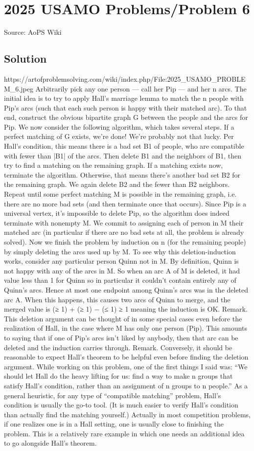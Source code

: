 \documentclass[12pt]{article}
\begin{document}
\section*{{2025 USAMO Problems/Problem 6}}
Source: AoPS Wiki

\subsection*{Solution}
https://artofproblemsolving.com/wiki/index.php/File:2025_USAMO_PROBLEM_6.jpeg Arbitrarily pick any one person — call her Pip — and her n arcs. The initial idea is to try to apply Hall’s marriage lemma to match the n people with Pip’s arcs (such that each such person is happy with their matched arc). To that end, construct the obvious bipartite graph G between the people and the arcs for Pip. We now consider the following algorithm, which takes several steps. If a perfect matching of G exists, we’re done! We’re probably not that lucky. Per Hall’s condition, this means there is a bad set B1 of people, who are compatible with fewer than |B1| of the arcs. Then delete B1 and the neighbors of B1, then try to find a matching on the remaining graph. If a matching exists now, terminate the algorithm. Otherwise, that means there’s another bad set B2 for the remaining graph. We again delete B2 and the fewer than B2 neighbors. Repeat until some perfect matching M is possible in the remaining graph, i.e. there are no more bad sets (and then terminate once that occurs). Since Pip is a universal vertex, it’s impossible to delete Pip, so the algorithm does indeed terminate with nonempty M. We commit to assigning each of person in M their matched arc (in particular if there are no bad sets at all, the problem is already solved). Now we finish the problem by induction on n (for the remaining people) by simply deleting the arcs used up by M. To see why this deletion-induction works, consider any particular person Quinn not in M. By definition, Quinn is not happy with any of the arcs in M. So when an arc A of M is deleted, it had value less than 1 for Quinn so in particular it couldn’t contain entirely any of Quinn’s arcs. Hence at most one endpoint among Quinn’s arcs was in the deleted arc A. When this happens, this causes two arcs of Quinn to merge, and the merged value is (≥ 1) + (≥ 1) − (≤ 1) ≥ 1 meaning the induction is OK. Remark. This deletion argument can be thought of in some special cases even before the realization of Hall, in the case where M has only one person (Pip). This amounts to saying that if one of Pip’s arcs isn’t liked by anybody, then that arc can be deleted and the induction carries through. Remark. Conversely, it should be reasonable to expect Hall’s theorem to be helpful even before finding the deletion argument. While working on this problem, one of the first things I said was: “We should let Hall do the heavy lifting for us: find a way to make n groups that satisfy Hall’s condition, rather than an assignment of n groups to n people.” As a general heuristic, for any type of “compatible matching” problem, Hall’s condition is usually the go-to tool. (It is much easier to verify Hall’s condition than actually find the matching yourself.) Actually in most competition problems, if one realizes one is in a Hall setting, one is usually close to finishing the problem. This is a relatively rare example in which one needs an additional idea to go alongside Hall’s theorem.
\end{document}
